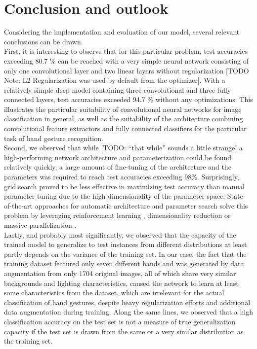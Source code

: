 \documentclass[a4paper]{article}
\begin{document}
\section{Conclusion and outlook}
\label{ch:conclusion}
Considering the implementation and evaluation of our model, several relevant conclusions can be drawn.\\
First, it is interesting to observe that for this particular problem, test accuracies exceeding 80.7 \% can be reached with a very simple neural network consisting of only one convolutional layer and two linear layers without regularization [TODO Note: L2 Regularization was used by default from the optimizer]. With a relatively simple deep model containing three convolutional and three fully connected layers, test accuracies exceeded 94.7 \% without any optimizations. This illustrates the particular suitability of convolutional neural networks for image classification in general, as well as the suitability of the architecture combining convolutional feature extractors and fully connected classifiers for the particular task of hand gesture recognition.\\
Second, we observed that while [TODO: \enquote{that while} sounds a little strange] a high-performing network architecture and parameterization could be found relatively quickly, a large amount of fine-tuning of the architecture and the parameters was required to reach test accuracies exceeding 98\%. Surprisingly, grid search proved to be less effective in maximizing test accuracy than manual parameter tuning due to the high dimensionality of the parameter space. State-of-the-art approaches for automatic architecture and parameter search solve this problem by leveraging reinforcement learning \cite{Zoph2016}, dimensionality reduction \cite{Hinz2018} or massive parallelization \cite{Li2018}.\\
Lastly, and probably most significantly, we observed that the capacity of the trained model to generalize to test instances from different distributions at least partly depends on the variance of the training set. In our case, the fact that the training dataset featured only seven different hands and was generated by data augmentation from only 1704 original images, all of which share very similar backgrounds and lighting characteristics, caused the network to learn at least some characteristics from the dataset, which are irrelevant for the actual classification of hand gestures, despite heavy regularization efforts and additional data augmentation during training. Along the same lines, we observed that a high classification accuracy on the test set is not a measure of true generalization capacity if the test set is drawn from the same or a very similar distribution as the training set.\\
\end{document}
